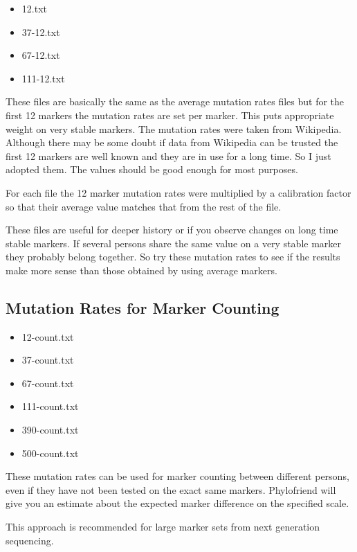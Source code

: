 \begin{itemize}
\item 12.txt
\item 37-12.txt
\item 67-12.txt
\item 111-12.txt
\end{itemize}

These files are basically the same as the average mutation
rates files but for the first 12 markers the mutation rates
are set per marker. This puts appropriate weight on
very stable markers. The mutation rates were taken from
Wikipedia\cite{Wiki-List_of_DYS_markers}. Although there
may be some doubt if data from Wikipedia can be trusted 
the first 12 markers are well known and they are in use
for a long time. So I just adopted them. The values should be
good enough for most purposes.

For each file the 12 marker mutation rates were multiplied
by a calibration factor so that their average value matches
that from the rest of the file.

These files are useful for deeper history or if you
observe changes on long time stable markers. If several
persons share the same value on a very stable marker they
probably belong together. So try these mutation rates to
see if the results make more sense than those obtained by
using average markers.


\subsection*{Mutation Rates for Marker Counting}

\begin{itemize}
\item 12-count.txt
\item 37-count.txt
\item 67-count.txt
\item 111-count.txt
\item 390-count.txt
\item 500-count.txt
\end{itemize}

These mutation rates can be used for marker counting between
different persons, even if they have not been tested on the exact
same markers. Phylofriend will give you an estimate about the
expected marker difference on the specified scale.

This approach is recommended for large marker sets from next
generation sequencing.


